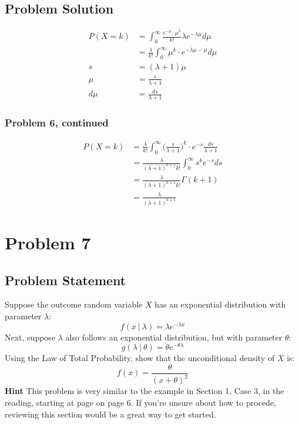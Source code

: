 \documentclass[12pt]{article}
\theoremstyle{definition}
\begin{document}
\subsection*{Problem Solution}
\begin{align*}
P(X=k) &= \int_0^\infty \frac{e^{-\mu} \cdot \mu^k}{k!} \lambda e^{-\lambda \mu} d\mu\\
&= \frac{\lambda}{k!} \int_0^\infty \mu^k \cdot e^{-\lambda \mu - \mu}d\mu\\
s &= (\lambda + 1) \mu\\
\mu &= \frac{s}{\lambda + 1}\\
d\mu &= \frac{ds}{\lambda + 1}
\end{align*}


\newpage
\subsubsection*{Problem 6, continued}
\begin{align*}
P(X=k) &= \frac{\lambda}{k!} \int_0^\infty \biggr(\frac{s}{\lambda + 1}\biggr)^k \cdot e^{-s}\frac{ds}{\lambda + 1}\\
&= \frac{\lambda}{(\lambda + 1)^{k + 1} k!} \int_0^\infty s^k e^{-s}ds\\
&= \frac{\lambda}{(\lambda + 1)^{k + 1} k!} \Gamma(k + 1)\\
&= \frac{\lambda}{(\lambda + 1)^{k + 1}}
\end{align*}


\newpage
\section*{Problem 7}

\subsection*{Problem Statement}

Suppose the outcome random variable $X$ has an exponential distribution with parameter $\lambda$:
$$
f(x\ |\ \lambda) = \lambda  e^{-\lambda x}
$$
Next, suppose $\lambda$ also follows an exponential distribution, but with parameter $\theta$:
$$
g(\lambda\ |\ \theta) = \theta e^{-\theta \lambda}
$$
Using the Law of Total Probability, show that the unconditional density of $X$ is:
$$
f(x) = \frac{ \theta }{(x + \theta)^2}
$$
{\bf Hint} This problem is very similar to the example in Section 1, Case 3, in the reading, starting at page on page 6. If you're unsure about how to procede, reviewing this section would be a great way to get started.
\end{document}

